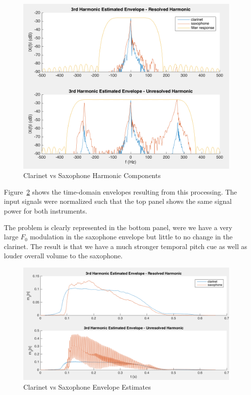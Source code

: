 \documentclass [11pt, proquest] {uwthesis}[2015/03/03]
\begin{document}
\begin{figure}[!ht]
  \centering
    \includegraphics[width=1\textwidth]{clarinetVSsax_F}
    \caption{Clarinet vs Saxophone Harmonic Components}\label{fig:clarinetVSsax_F}
\end{figure}

Figure~\ref{fig:clarinetVSsax_T} shows the time-domain envelopes resulting from this processing.  The input signals were normalized such that the top panel shows the same signal power for both instruments.

The problem is clearly represented in the bottom panel, were we have a very large $F_0$ modulation in the saxophone envelope but little to no change in the clarinet.  The result is that we have a much stronger temporal pitch cue as well as louder overall volume to the saxophone.

\begin{figure}[!ht]
  \centering
    \includegraphics[width=1\textwidth]{clarinetVSsax_T}   
    \caption{Clarinet vs Saxophone Envelope Estimates}\label{fig:clarinetVSsax_T}
\end{figure}
\end{document}

